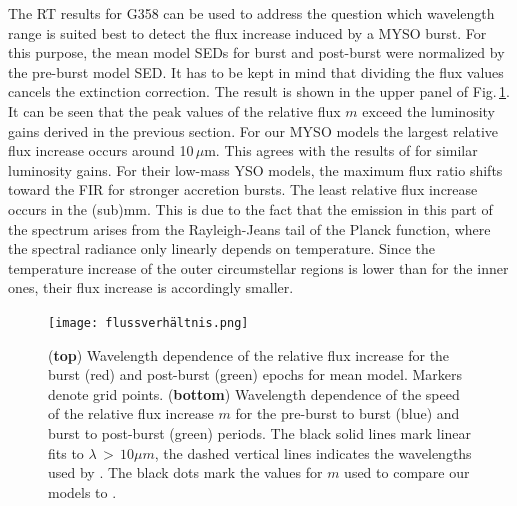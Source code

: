 The RT results for G358 can be used to address the question which wavelength range is suited best to detect the flux increase induced by a MYSO burst. For this purpose, the mean model SEDs for burst and post-burst were normalized by the pre-burst model SED. It has to be kept in mind that dividing the flux values cancels the extinction correction. The result is shown in the upper panel of  Fig.\,\ref{fig:wfr}. It can be seen that the peak values of the relative flux $m$ exceed the luminosity gains derived in the previous section. For our MYSO models the largest relative flux increase occurs around 10\,$\mu$m. This agrees with the results of \citet{2019MNRAS.487.4465M} for similar luminosity gains. %
For their low-mass YSO models, the maximum flux ratio shifts toward the FIR for stronger accretion bursts.
The least relative flux increase occurs in the (sub)mm. This is due to the fact that the emission in this part of the spectrum arises from the Rayleigh-Jeans tail of the Planck function, where the spectral radiance only linearly depends on temperature. Since the temperature increase of the outer circumstellar regions is lower than for the inner ones, their flux increase is accordingly smaller. 

\begin{figure}
	\centering
    \texttt{[image: flussverhältnis.png]}
	\caption{({\bf top}) Wavelength dependence of the relative flux increase for the burst (red) and post-burst (green) epochs for mean model. Markers denote grid points.
	({\bf bottom}) Wavelength dependence of the speed of the relative flux increase $m$ for the pre-burst to burst (blue) and burst to post-burst (green) periods. The black solid lines mark linear fits to $\lambda\,{>}\,10\mu m$, the dashed vertical lines indicates the wavelengths used by \citet{10.1093/mnras/staa1254}. The black dots mark the values for $m$ used to compare our models to \citet{10.1093/mnras/staa1254}.	}
    \label{fig:wfr}
\end{figure}

